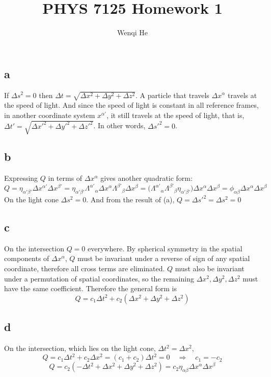 \documentclass{article}
\title{PHYS 7125 Homework 1}
\author{Wenqi He}
\begin{document}
\maketitle
\section{}
\subsection*{a}
If $\Delta s^2 = 0$ then $\Delta t = \sqrt{\Delta x^2 + \Delta y^2 + \Delta z^2}$. A particle that travels $\Delta x^\alpha$ travels at the speed of light. And since the speed of light is constant in all reference frames, in another coordinate system $x^{\alpha'}$, it still travels at the speed of light, that is, $\Delta t' = \sqrt{\Delta x'^2 + \Delta y'^2 + \Delta z'^2}$. In other words, $\Delta s'^2 = 0$.
\subsection*{b}
Expressing $Q$ in terms of $\Delta x^\alpha$ gives another quadratic form:
\[ Q = \eta_{\alpha'\beta'}\Delta x^{\alpha'} \Delta x^{\beta'}  
	= \eta_{\alpha'\beta'} \Lambda^{\alpha'}{}_\alpha \Delta x^\alpha  \Lambda^{\beta'}{}_\beta \Delta x^\beta
	= \Big(\Lambda^{\alpha'}{}_\alpha\Lambda^{\beta'}{}_\beta\eta_{\alpha'\beta'}\Big) \Delta x^\alpha \Delta x^\beta
	= \phi_{\alpha\beta}\Delta x^\alpha \Delta x^\beta \]
On the light cone $\Delta s^2 = 0$. And from the result of (a), $Q = \Delta s'^2 = \Delta s^2 = 0$
\subsection*{c}
On the intersection $Q = 0$ everywhere. By spherical symmetry in the spatial components of $\Delta x^\alpha$, $Q$ must be invariant under a reverse of sign of any spatial coordinate, therefore all cross terms are eliminated. $Q$ must also be invariant under a permutation of spatial coordinates, so the remaining $\Delta x^2, \Delta y^2, \Delta z^2$ must have the same coefficient. Therefore the general form is 
\[ Q = c_1\Delta t^2 + c_2(\Delta x^2 + \Delta y^2 + \Delta z^2) \]
\subsection*{d}
On the intersection, which lies on the light cone, $\Delta t^2 = \Delta x^2$,
\[ Q = c_1\Delta t^2 + c_2 \Delta x^2 = (c_1  + c_2) \Delta t^2 = 0 \quad\Rightarrow\quad c_1 = -c_2\]
\[ Q = c_2(-\Delta t ^2 +\Delta x^2 + \Delta y^2 + \Delta z^2) = c_2\eta_{\alpha\beta}\Delta x^\alpha \Delta x^\beta \]
\end{document}
